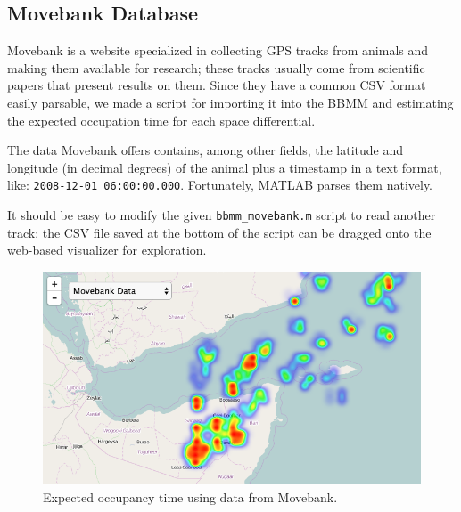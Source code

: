 \documentclass[12pt]{article}
\begin{document}
\subsection{Movebank Database}

Movebank is a website specialized in collecting GPS tracks from animals and making them available for research; these tracks usually come from scientific papers that present results on them. Since they have a common CSV format easily parsable, we made a script for importing it into the BBMM and estimating the expected occupation time for each space differential.

The data Movebank offers contains, among other fields, the latitude and longitude (in decimal degrees) of the animal plus a timestamp in a text format, like: \texttt{2008-12-01 06:00:00.000}. Fortunately, MATLAB parses them natively.

It should be easy to modify the given \texttt{bbmm\_movebank.m} script to read another track; the CSV file saved at the bottom of the script can be dragged onto the web-based visualizer for exploration.

\begin{figure}[H]
    \centering
    \includegraphics[width=\textwidth]{plots/movebank_sample.png}
    \caption{Expected occupancy time using data from Movebank.}
    \label{fig:movebank_sample}
\end{figure}

\end{document}
